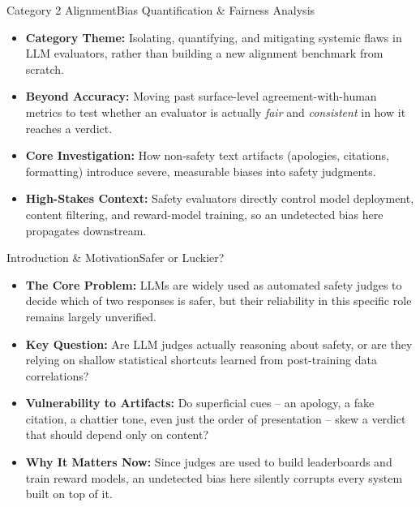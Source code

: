 \documentclass[10pt]{beamer}
\begin{document}
	\begin{frame}{Category 2 Alignment}{Bias Quantification \& Fairness Analysis}
	\begin{itemize}
		\item \textbf{Category Theme:} Isolating, quantifying, and mitigating systemic flaws in LLM evaluators, rather than building a new alignment benchmark from scratch.
		\item \textbf{Beyond Accuracy:} Moving past surface-level agreement-with-human metrics to test whether an evaluator is actually \emph{fair} and \emph{consistent} in how it reaches a verdict.
		\item \textbf{Core Investigation:} How non-safety text artifacts (apologies, citations, formatting) introduce severe, measurable biases into safety judgments.
		\item \textbf{High-Stakes Context:} Safety evaluators directly control model deployment, content filtering, and reward-model training, so an undetected bias here propagates downstream.
	\end{itemize}
	\end{frame}

	\begin{frame}{Introduction \& Motivation}{Safer or Luckier?}
	\begin{itemize}
		\item \textbf{The Core Problem:} LLMs are widely used as automated safety judges to decide which of two responses is safer, but their reliability in this specific role remains largely unverified.
		\item \textbf{Key Question:} Are LLM judges actually reasoning about safety, or are they relying on shallow statistical shortcuts learned from post-training data correlations?
		\item \textbf{Vulnerability to Artifacts:} Do superficial cues -- an apology, a fake citation, a chattier tone, even just the order of presentation -- skew a verdict that should depend only on content?
		\item \textbf{Why It Matters Now:} Since judges are used to build leaderboards and train reward models, an undetected bias here silently corrupts every system built on top of it.
	\end{itemize}
	\end{frame}
\end{document}
